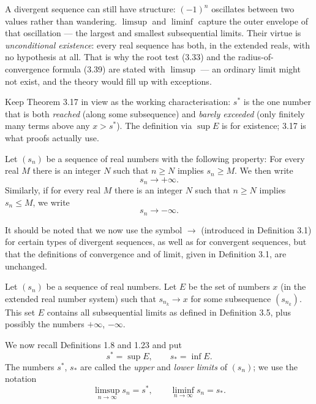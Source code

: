 \begin{signpost}
A divergent sequence can still have structure: $(-1)^n$ oscillates between two
values rather than wandering. $\limsup$ and $\liminf$ capture the outer
envelope of that oscillation --- the largest and smallest subsequential
limits. Their virtue is \emph{unconditional existence}: every real sequence has
both, in the extended reals, with no hypothesis at all. That is why the root
test (3.33) and the radius-of-convergence formula (3.39) are stated with
$\limsup$ --- an ordinary limit might not exist, and the theory would fill up
with exceptions.

\smallskip
Keep Theorem 3.17 in view as the working characterisation: $s^* $ is the one
number that is both \emph{reached} (along some subsequence) and \emph{barely
exceeded} (only finitely many terms above any $x > s^*$). The definition via
$\sup E$ is for existence; 3.17 is what proofs actually use.
\end{signpost}

Let $(s_n)$ be a sequence of real numbers with the following property: For
every real $M$ there is an integer $N$ such that $n \ge N$ implies
$s_n \ge M$. We then write
\[ s_n \to +\infty. \]
Similarly, if for every real $M$ there is an integer $N$ such that $n \ge N$
implies $s_n \le M$, we write
\[ s_n \to -\infty. \]

It should be noted that we now use the symbol $\to$ (introduced in Definition
3.1) for certain types of divergent sequences, as well as for convergent
sequences, but that the definitions of convergence and of limit, given in
Definition 3.1, are unchanged.

Let $(s_n)$ be a sequence of real numbers. Let $E$ be the set of numbers $x$
(in the extended real number system) such that $s_{n_k} \to x$ for some
subsequence $(s_{n_k})$. This set $E$ contains all subsequential limits as
defined in Definition 3.5, plus possibly the numbers $+\infty$, $-\infty$.

We now recall Definitions 1.8 and 1.23 and put
\[ s^* = \sup E, \qquad s_* = \inf E. \]
The numbers $s^*$, $s_*$ are called the \emph{upper} and \emph{lower limits} of
$(s_n)$; we use the notation
\[ \limsup_{n\to\infty} s_n = s^*, \qquad \liminf_{n\to\infty} s_n = s_*. \]

